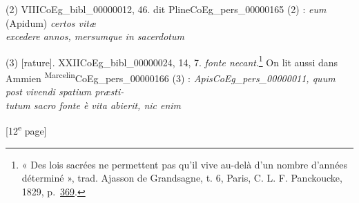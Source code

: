 \documentclass{book}
\begin{document}
{\begin{paracol}{2}
\noindent (2) VIII\gls{CoEg_bibl_00000012}, 46.
\switchcolumn
\noindent dit Pline\gls{CoEg_pers_00000165} (2) : \textit{eum} (Apidum) \textit{certos vitæ\\
excedere annos, mersumque in sacerdotum}\end{paracol}
\begin{paracol}{2}
\noindent (3) [rature]. XXII\gls{CoEg_bibl_00000024}, 14, 7.
\switchcolumn
\noindent \textit{fonte necant}.\footnote{« Des lois sacrées ne permettent pas qu’il vive au-delà d’un nombre d’années déterminé », trad. Ajasson de Grandsagne, t. 6, Paris, C. L. F. Panckoucke, 1829, p.~\href{https://gallica.bnf.fr/ark:/12148/bpt6k5802657d/f378.item}{369}.} On lit aussi dans Ammien \textsuperscript{Marcelin}\gls{CoEg_pers_00000166} (3) :
\textit{Apis\gls{CoEg_pers_00000011}, quum post vivendi spatium præsti-\\
tutum sacro fonte è vita abierit, nic enim}
\end{paracol}

{\footnotesize\begin{center} {[12\textsuperscript{e} page]}\end{center}}

}
\end{document}
